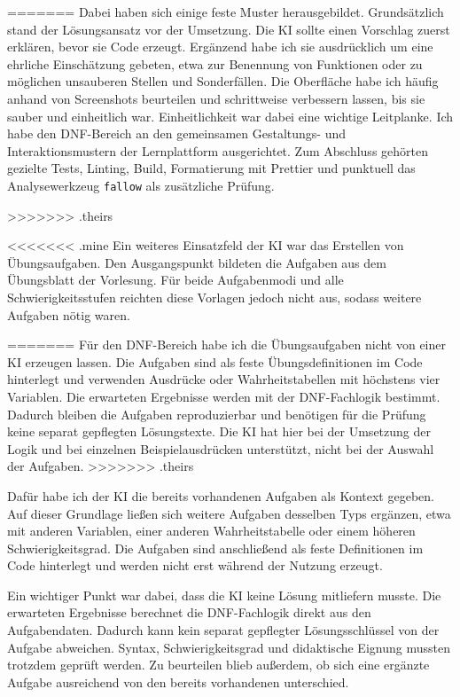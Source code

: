 =======
Dabei haben sich einige feste Muster herausgebildet. Grundsätzlich stand der Lösungsansatz
vor der Umsetzung. Die KI sollte einen Vorschlag zuerst erklären, bevor sie Code erzeugt.
Ergänzend habe ich sie ausdrücklich um eine ehrliche Einschätzung gebeten, etwa zur
Benennung von Funktionen oder zu möglichen unsauberen Stellen und Sonderfällen. Die
Oberfläche habe ich häufig anhand von Screenshots beurteilen und schrittweise verbessern
lassen, bis sie sauber und einheitlich war. Einheitlichkeit war dabei eine wichtige
Leitplanke. Ich habe den DNF-Bereich an den gemeinsamen Gestaltungs- und
Interaktionsmustern der Lernplattform ausgerichtet. Zum Abschluss gehörten gezielte Tests,
Linting, Build, Formatierung mit Prettier und punktuell das Analysewerkzeug
\texttt{fallow} als zusätzliche Prüfung.

>>>>>>> .theirs

<<<<<<< .mine
Ein weiteres Einsatzfeld der KI war das Erstellen von Übungsaufgaben. Den Ausgangspunkt
bildeten die Aufgaben aus dem Übungsblatt der Vorlesung. Für beide Aufgabenmodi und alle
Schwierigkeitsstufen reichten diese Vorlagen jedoch nicht aus, sodass weitere Aufgaben
nötig waren.


=======
Für den DNF-Bereich habe ich die Übungsaufgaben nicht von einer KI erzeugen lassen. Die
Aufgaben sind als feste Übungsdefinitionen im Code hinterlegt und verwenden Ausdrücke oder
Wahrheitstabellen mit höchstens vier Variablen. Die erwarteten Ergebnisse werden mit der
DNF-Fachlogik bestimmt. Dadurch bleiben die Aufgaben reproduzierbar und benötigen für die
Prüfung keine separat gepflegten Lösungstexte. Die KI hat hier bei der Umsetzung der Logik
und bei einzelnen Beispielausdrücken unterstützt, nicht bei der Auswahl der Aufgaben.
>>>>>>> .theirs

Dafür habe ich der KI die bereits vorhandenen Aufgaben als Kontext gegeben. Auf dieser
Grundlage ließen sich weitere Aufgaben desselben Typs ergänzen, etwa mit anderen Variablen,
einer anderen Wahrheitstabelle oder einem höheren Schwierigkeitsgrad. Die Aufgaben sind
anschließend als feste Definitionen im Code hinterlegt und werden nicht erst während der
Nutzung erzeugt.

Ein wichtiger Punkt war dabei, dass die KI keine Lösung mitliefern musste. Die erwarteten
Ergebnisse berechnet die DNF-Fachlogik direkt aus den Aufgabendaten. Dadurch kann kein
separat gepflegter Lösungsschlüssel von der Aufgabe abweichen. Syntax, Schwierigkeitsgrad
und didaktische Eignung mussten trotzdem geprüft werden. Zu beurteilen blieb außerdem, ob
sich eine ergänzte Aufgabe ausreichend von den bereits vorhandenen unterschied.

